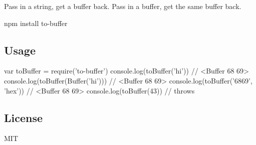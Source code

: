 Pass in a string, get a buffer back. Pass in a buffer, get the same buffer back.


\begin{DoxyCode}
npm install to-buffer
\end{DoxyCode}


\href{https://travis-ci.org/mafintosh/to-buffer}{\tt }

\subsection*{Usage}


\begin{DoxyCode}
var toBuffer = require('to-buffer')
console.log(toBuffer('hi')) // <Buffer 68 69>
console.log(toBuffer(Buffer('hi'))) // <Buffer 68 69>
console.log(toBuffer('6869', 'hex')) // <Buffer 68 69>
console.log(toBuffer(43)) // throws
\end{DoxyCode}


\subsection*{License}

M\+IT 